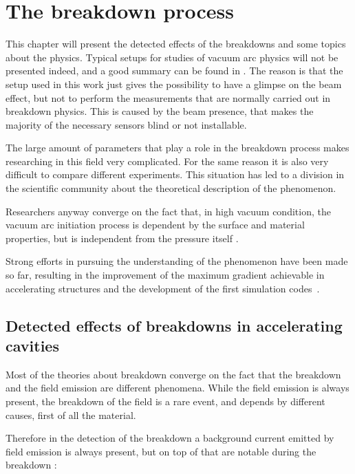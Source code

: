 \chapter[The breakdown process]{The breakdown process}
\label{chap:BDs}

This chapter will present the detected effects of the breakdowns and some topics about the physics. Typical setups for studies of vacuum arc physics will not be presented indeed, and a good summary can be found in \cite{Kovermann:1330346}. The reason is that the setup used in this work just gives the possibility to have a glimpse on the beam effect, but not to perform the measurements that are normally carried out in breakdown physics. This is caused by the beam presence, that makes the majority of the necessary sensors blind or not installable.

The large amount of parameters that play a role in the breakdown process makes researching in this field very complicated. For the same reason it is also very difficult to compare different experiments. This situation has led to a division in the scientific community about the theoretical description of the phenomenon.

Researchers anyway converge on the fact that, in high vacuum condition, the vacuum arc initiation process is dependent by the surface and material properties, but is independent from the pressure itself \cite{alpert:triggers}.

Strong efforts in pursuing the understanding of the phenomenon have been made so far, resulting in the improvement of the maximum gradient achievable in accelerating structures and the development of the first simulation codes~\cite{Insepov:1373092}.



\section[Detected effects of breakdowns in accelerating cavities]{Detected effects of breakdowns in accelerating cavities}

Most of the theories about breakdown converge on the fact that the breakdown and the field emission are different phenomena. While the field emission is always present, the breakdown of the field is a rare event, and depends by different causes, first of all the material.

Therefore in the detection of the breakdown a background current emitted by field emission is always present, but on top of that are notable during the breakdown \cite{Wuensch:583549}:

